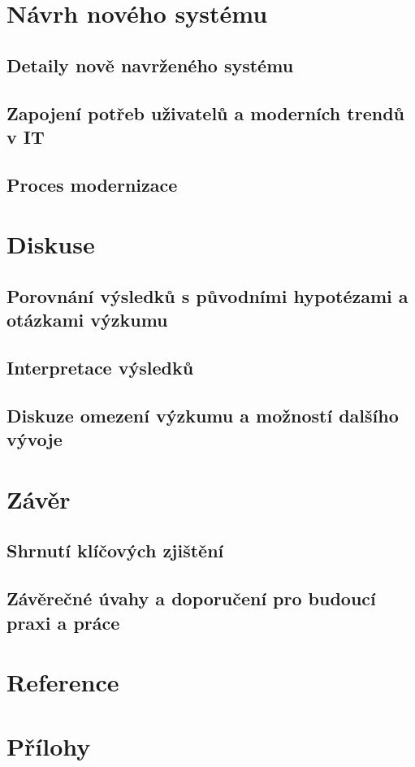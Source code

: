 \documentclass[FM,Proj]{tulthesis}
\begin{document}
\chapter{Návrh nového systému}
\section{Detaily nově navrženého systému}
\section{Zapojení potřeb uživatelů a moderních trendů v IT}
\section{Proces modernizace}

\chapter{Diskuse}
\section{Porovnání výsledků s původními hypotézami a otázkami výzkumu}
\section{Interpretace výsledků}
\section{Diskuze omezení výzkumu a možností dalšího vývoje}

\chapter{Závěr}
\section{Shrnutí klíčových zjištění}
\section{Závěrečné úvahy a doporučení pro budoucí praxi a práce}

\chapter{Reference}
\printbibliography[heading=none]

\chapter{Přílohy}
\end{document}
